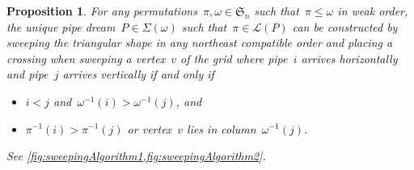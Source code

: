 \documentclass[reqno]{amsart}
\newtheorem{proposition}[theorem]{Proposition}
\theoremstyle{definition}
\newcommand{\fS}{\mathfrak{S}} %
\newcommand{\acyclicPipeDreams}{\Sigma} %
\newcommand{\linearExtensions}{\mathcal{L}} %
\begin{document}
\begin{proposition}
\label{prop:sweepingAlgorithm}
For any permutations~$\pi,\omega \in \fS_n$ such that~$\pi \le \omega$ in weak order, the unique pipe dream~$P \in \acyclicPipeDreams(\omega)$ such that~$\pi \in \linearExtensions(P)$ can be constructed by sweeping the triangular shape in any northeast compatible order and placing a crossing when sweeping a vertex~$v$ of the grid where pipe~$i$ arrives horizontally and pipe~$j$ arrives vertically if and only if
\begin{itemize}
\item $i < j$ and~$\omega^{-1}(i) > \omega^{-1}(j)$, and 
\item $\pi^{-1}(i) > \pi^{-1}(j)$ or vertex~$v$ lies in column~$\omega^{-1}(j)$.
\end{itemize}
See \cref{fig:sweepingAlgorithm1,fig:sweepingAlgorithm2}.
\end{proposition}
\end{document}
